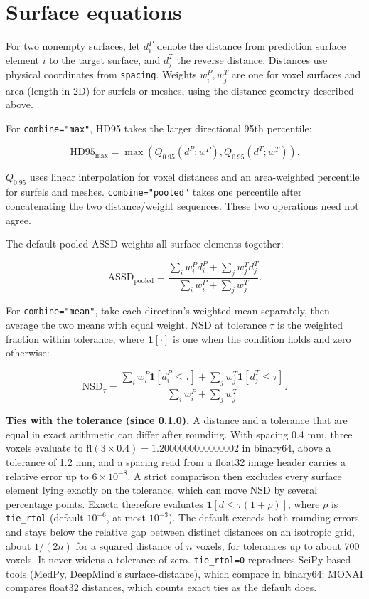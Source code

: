\section{Surface equations}\label{conventions:surface-equations}

For two nonempty surfaces, let \(d_i^P\) denote the distance from prediction surface element
\(i\) to the target surface, and \(d_j^T\) the reverse distance. Distances use physical coordinates
from \texttt{spacing}. Weights \(w_i^P,w_j^T\) are one for voxel surfaces and area (length in 2D) for
surfels or meshes, using the distance geometry described above.

For \texttt{combine="max"}, HD95 takes the larger directional 95th percentile:

\[
\mathrm{HD95}_{\mathrm{max}}
=\max\left(Q_{0.95}(d^P;w^P),Q_{0.95}(d^T;w^T)\right).
\]

\(Q_{0.95}\) uses linear interpolation for voxel distances and an area-weighted percentile
for surfels and meshes. \texttt{combine="pooled"} takes one percentile after concatenating the two
distance/weight sequences. These two operations need not agree.

The default pooled ASSD weights all surface elements together:

\[
\mathrm{ASSD}_{\mathrm{pooled}}
=\frac{\sum_i w_i^P d_i^P+\sum_j w_j^T d_j^T}
{\sum_i w_i^P+\sum_j w_j^T}.
\]

For \texttt{combine="mean"}, take each direction's weighted mean separately, then average the two
means with equal weight. NSD at tolerance \(\tau\) is the weighted fraction within tolerance,
where \(\mathbf{1}[\cdot]\) is one when the condition holds and zero otherwise:

\[
\mathrm{NSD}_{\tau}
=\frac{\sum_i w_i^P\mathbf{1}[d_i^P\leq\tau]
+\sum_j w_j^T\mathbf{1}[d_j^T\leq\tau]}
{\sum_i w_i^P+\sum_j w_j^T}.
\]

\textbf{Ties with the tolerance (since 0.1.0).} A distance and a tolerance that are equal in exact
arithmetic can differ after rounding. With spacing 0.4 mm, three voxels evaluate to
\(\mathrm{fl}(3\times0.4)=1.2000000000000002\) in binary64, above a tolerance of 1.2 mm, and a
spacing read from a float32 image header carries a relative error up to \(6\times10^{-8}\). A strict
comparison then excludes every surface element lying exactly on the tolerance, which can move NSD
by several percentage points. Exacta therefore evaluates \(\mathbf{1}[d\leq\tau(1+\rho)]\), where
\(\rho\) is \texttt{tie\_rtol} (default \(10^{-6}\), at most \(10^{-3}\)). The default exceeds both rounding
errors and stays below the relative gap between distinct distances on an isotropic grid, about
\(1/(2n)\) for a squared distance of \(n\) voxels, for tolerances up to about 700 voxels. It never
widens a tolerance of zero. \texttt{tie\_rtol=0} reproduces SciPy-based tools (MedPy, DeepMind's
surface-distance), which compare in binary64; MONAI compares float32 distances, which counts
exact ties as the default does.


